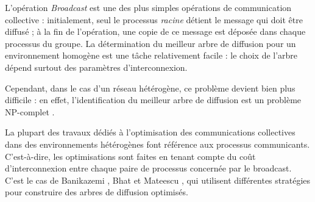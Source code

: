 L'opération \emph{Broadcast} est une des plus simples opérations de
communication collective : initialement, seul le processus \emph{racine}
détient le message qui doit être diffusé ; à la fin de l'opération,
une copie de ce message est déposée dans chaque processus du groupe.
La détermination du meilleur arbre de diffusion pour un environnement
homogène est une tâche relativement facile : le choix de l'arbre dépend
surtout des paramètres d'interconnexion.

Cependant, dans le cas d'un réseau hétérogène, ce problème devient
bien plus difficile : en effet, l'identification du meilleur arbre
de diffusion est un problème NP-complet \cite{Bhat99}\cite{Beaumont04c,Beaumont05b}\cite{PangfengLiu04}.

%

La plupart des travaux dédiés à l'optimisation des communications
collectives dans des environnements hétérogènes font référence aux
processus communicants. C'est-à-dire, les optimisations sont faites
en tenant compte du coût d'interconnexion entre chaque paire de processus
concernée par le broadcast. C'est le cas de Banikazemi \cite{Banikazemi98},
Bhat \cite{Bhat99,Bhat03} et Mateescu \cite{Mateescu05}, qui utilisent
différentes stratégies pour construire des arbres de diffusion optimisés.

